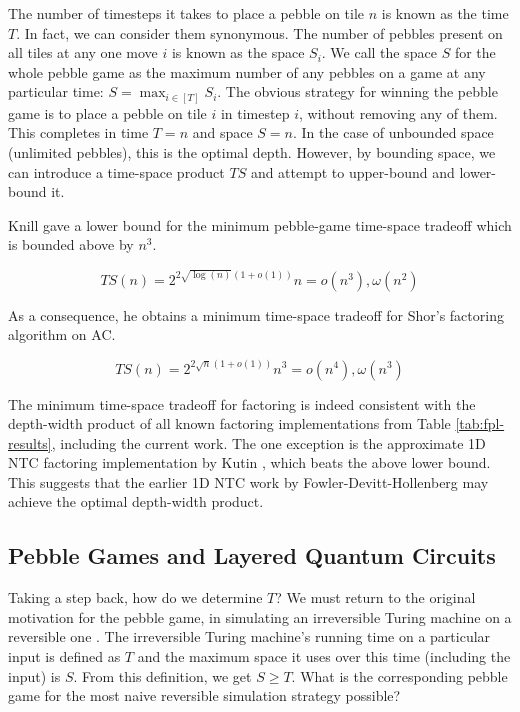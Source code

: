 The number of timesteps it takes to place a pebble on tile $n$ is known
as the time $T$. In fact, we can consider them synonymous.
The number of pebbles present on all tiles at any one move $i$
is known as the space $S_i$. We call the space $S$ for the whole pebble
game as the maximum number of any pebbles on a game at any particular time:
$S = \max_{i \in [T]} S_i$.
The obvious strategy for winning the pebble game is
to place a pebble on tile $i$ in timestep $i$, without removing any of them.
This completes in time $T=n$ and space $S = n$. In the case of unbounded
space (unlimited pebbles), this is the optimal depth. However, by
bounding space, we can introduce a time-space product $TS$ and attempt to
upper-bound and lower-bound it.

Knill gave a lower bound for the minimum pebble-game time-space tradeoff
\cite{Knill1995} which is bounded above by $n^3$.

\begin{equation}
TS(n) = 2^{2\sqrt{\log(n)}(1 + o(1))}n = o(n^3), \omega(n^2)
\end{equation}

As a consequence, he obtains a minimum time-space tradeoff for
Shor's factoring algorithm on \textsf{AC}.

\begin{equation}
TS(n) = 2^{2\sqrt{n}(1 + o(1))}n^3 = o(n^4), \omega(n^3)
\end{equation}

The minimum time-space tradeoff for factoring is indeed consistent with the depth-width product of all known
factoring implementations from Table \ref{tab:fpl-results}, including
the current work. The one exception is the approximate 1D NTC factoring
implementation by Kutin \cite{Kutin2006}, which beats the above lower bound.
This suggests that the earlier 1D NTC work by Fowler-Devitt-Hollenberg
\cite{Fowler2004} may achieve the optimal depth-width product.

\subsection{Pebble Games and Layered Quantum Circuits}
\label{subsec:cohere-pebble-lqc}

Taking a step back, how do we determine $T$? We must return to the original
motivation for the pebble game, in simulating an irreversible Turing machine
on a reversible one \cite{Bennett1989}. The irreversible Turing machine's
running time on a particular input is defined as $T$ and the maximum
space it uses over this time (including the input) is $S$. From this definition,
we get $S \ge T$. What is the corresponding pebble game for the most naive
reversible simulation strategy possible?

